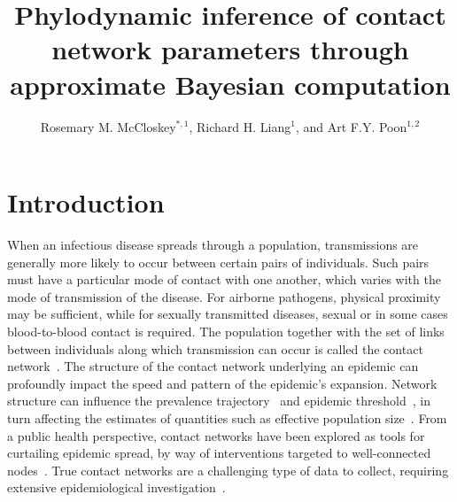 \documentclass[nogrid]{MBE}
\begin{document}
\title[Contact networks and ABC]{Phylodynamic inference of contact network
parameters through approximate Bayesian computation}
\author[McCloskey, Liang, and Poon]{Rosemary M. McCloskey$^{*,1}$, 
    Richard H. Liang$^1$, and Art F.Y. Poon$^{1,2}$}
\address{$^1$BC Centre for Excellence in HIV/AIDS, 608-1081 Burrard Street, Vancouver, Canada \\
$^2$Department of Medicine, University of British Columbia, Vancouver, Canada}
\editor{}
\abstract{}



\maketitle

\section{Introduction}

When an infectious disease spreads through a population, transmissions are
generally more likely to occur between certain pairs of individuals. Such pairs
must have a particular mode of contact with one another, which varies with the
mode of transmission of the disease. For airborne pathogens, physical proximity
may be sufficient, while for sexually transmitted diseases, \newpage\noindent %
sexual or in some cases blood-to-blood contact is required. The population
together with the set of links between individuals along which transmission can
occur is called the contact network~\citep{klovdahl1985social,
morris1993epidemiology}. The structure of the contact network underlying an
epidemic can profoundly impact the speed and pattern of the epidemic's
expansion. Network structure can influence the prevalence
trajectory~\citep{o2011contact} and epidemic
threshold~\citep{barthelemy2005dynamical}, in turn affecting the estimates of
quantities such as effective population size~\citep{goodreau2006assessing}.
From a public health perspective, contact networks have been explored as tools
for curtailing epidemic spread, by way of interventions targeted to
well-connected nodes~\citep{wang2015targeting}. True contact networks are a
challenging type of data to collect, requiring extensive epidemiological
investigation~\citep{welch2011statistical}.
\end{document}
